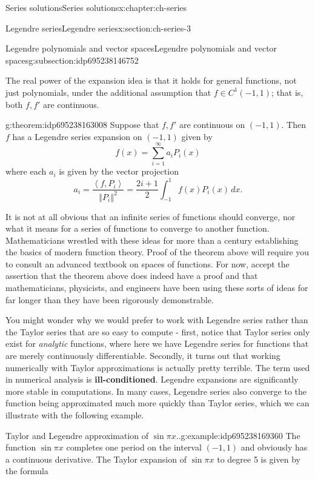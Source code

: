 \documentclass[oneside,10pt,]{book}
\newcommand{\terminology}[1]{\textbf{#1}}
\numberwithin{equation}{section}
\newcommand{\norm}[1]{\left\Vert#1\right\Vert}
\newcommand{\ip}[2]{\left\langle #1, #2 \right\rangle}
\numberwithin{equation}{section}
\begin{document}
\begin{chapterptx}{Series solutions}{}{Series solutions}{}{}{x:chapter:ch-series}
\begin{sectionptx}{Legendre series}{}{Legendre series}{}{}{x:section:ch-series-3}
\begin{subsectionptx}{Legendre polynomials and vector spaces}{}{Legendre polynomials and vector spaces}{}{}{g:subsection:idp695238146752}
%
\par
The real power of the expansion idea is that it holds for general functions, not just polynomials, under the additional assumption that \(f \in C^1(-1,1)\); that is, both \(f, f'\) are continuous.%
\begin{theorem}{}{}{g:theorem:idp695238163008}%
Suppose that \(f, f'\) are continuous on \((-1,1)\). Then \(f\) has a Legendre series expansion on \((-1,1)\) given by%
\begin{equation*}
f(x) = \sum_{i=1}^\infty a_i P_i(x)
\end{equation*}
where each \(a_i\) is given by the vector projection%
\begin{equation*}
a_i = \frac{\ip{f}{P_i}}{\norm{P_i}^2} = \frac{2i + 1}{2} \int_{-1}^1 f(x)P_i(x)\, dx.
\end{equation*}
%
\end{theorem}
It is not at all obvious that an infinite series of functions should converge, nor what it means for a series of functions to converge to another function. Mathematicians wrestled with these ideas for more than a century establishing the basics of modern function theory. Proof of the theorem above will require you to consult an advanced textbook on spaces of functions. For now, accept the assertion that the theorem above does indeed have a proof and that mathematicians, physicists, and engineers have been using these sorts of ideas for far longer than they have been rigorously demonstrable.%
\par
You might wonder why we would prefer to work with Legendre series rather than the Taylor series that are so easy to compute - first, notice that Taylor series only exist for \emph{analytic} functions, where here we have Legendre series for functions that are merely continuously differentiable. Secondly, it turns out that working numerically with Taylor approximations is actually pretty terrible. The term used in numerical analysis is \terminology{ill-conditioned}. Legendre expansions are significantly more stable in computations. In many cases, Legendre series also converge to the function being approximated much more quickly than Taylor series, which we can illustrate with the following example.%
\begin{example}{Taylor and Legendre approximation of \(\sin \pi x\)..}{g:example:idp695238169360}%
The function \(\sin \pi x\) completes one period on the interval \((-1, 1)\) and obviously has a continuous derivative. The Taylor expansion of \(\sin \pi x\) to degree 5 is given by the formula%

\end{example}
\end{subsectionptx}
\end{sectionptx}
\end{chapterptx}
\end{document}
